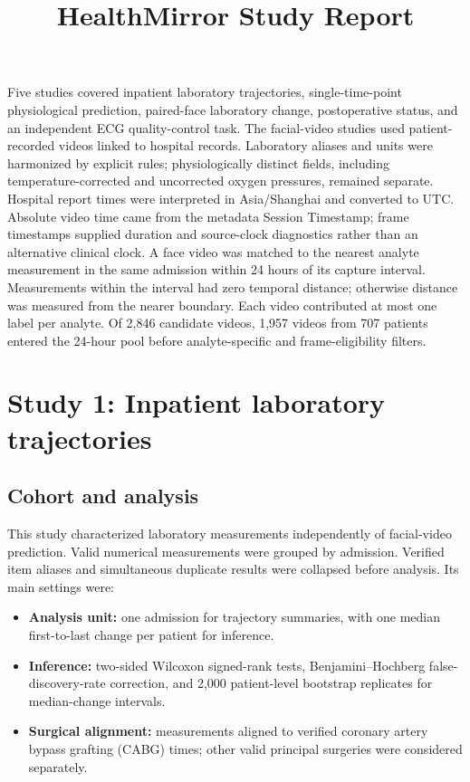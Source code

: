 \documentclass[10pt,a4paper]{article}
\title{HealthMirror Study Report}
\author{}
\date{}
\begin{document}
\maketitle
\vspace{-2em}

Five studies covered inpatient laboratory trajectories, single-time-point physiological prediction, paired-face laboratory change, postoperative status, and an independent ECG quality-control task. The facial-video studies used patient-recorded videos linked to hospital records. Laboratory aliases and units were harmonized by explicit rules; physiologically distinct fields, including temperature-corrected and uncorrected oxygen pressures, remained separate. Hospital report times were interpreted in Asia/Shanghai and converted to UTC. Absolute video time came from the metadata Session Timestamp; frame timestamps supplied duration and source-clock diagnostics rather than an alternative clinical clock. A face video was matched to the nearest analyte measurement in the same admission within 24 hours of its capture interval. Measurements within the interval had zero temporal distance; otherwise distance was measured from the nearer boundary. Each video contributed at most one label per analyte. Of 2,846 candidate videos, 1,957 videos from 707 patients entered the 24-hour pool before analyte-specific and frame-eligibility filters.

\section{Study 1: Inpatient laboratory trajectories}

\subsection{Cohort and analysis}

This study characterized laboratory measurements independently of facial-video prediction. Valid numerical measurements were grouped by admission. Verified item aliases and simultaneous duplicate results were collapsed before analysis. Its main settings were:
\begin{itemize}
\setlength{\itemsep}{1pt}
\item \textbf{Analysis unit:} one admission for trajectory summaries, with one median first-to-last change per patient for inference.
\item \textbf{Inference:} two-sided Wilcoxon signed-rank tests, Benjamini--Hochberg false-discovery-rate correction, and 2,000 patient-level bootstrap replicates for median-change intervals.
\item \textbf{Surgical alignment:} measurements aligned to verified coronary artery bypass grafting (CABG) times; other valid principal surgeries were considered separately.
\end{itemize}
\end{document}
